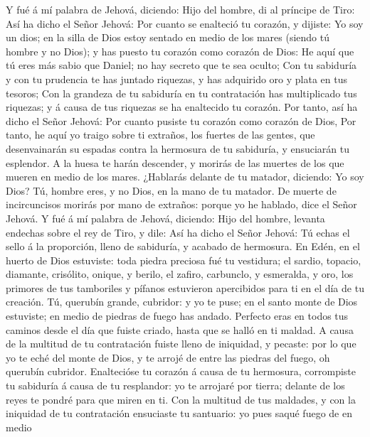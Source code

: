  Y fué á mí palabra de Jehová, diciendo:  Hijo
del hombre, di al príncipe de Tiro: Así ha dicho el Señor Jehová: Por
cuanto se enalteció tu corazón, y dijiste: Yo soy un dios; en la silla
de Dios estoy sentado en medio de los mares (siendo tú hombre y no
Dios); y has puesto tu corazón como corazón de Dios:  He
aquí que tú eres más sabio que Daniel; no hay secreto que te sea oculto;
 Con tu sabiduría y con tu prudencia te has juntado
riquezas, y has adquirido oro y plata en tus tesoros;  Con
la grandeza de tu sabiduría en tu contratación has multiplicado tus
riquezas; y á causa de tus riquezas se ha enaltecido tu corazón.
 Por tanto, así ha dicho el Señor Jehová: Por cuanto pusiste
tu corazón como corazón de Dios,  Por tanto, he aquí yo
traigo sobre ti extraños, los fuertes de las gentes, que desenvainarán
su espadas contra la hermosura de tu sabiduría, y ensuciarán tu
esplendor.  A la huesa te harán descender, y morirás de las
muertes de los que mueren en medio de los mares.  ¿Hablarás
delante de tu matador, diciendo: Yo soy Dios? Tú, hombre eres, y no
Dios, en la mano de tu matador.  De muerte de incircuncisos
morirás por mano de extraños: porque yo he hablado, dice el Señor
Jehová.  Y fué á mí palabra de Jehová, diciendo:
 Hijo del hombre, levanta endechas sobre el rey de Tiro, y
dile: Así ha dicho el Señor Jehová: Tú echas el sello á la proporción,
lleno de sabiduría, y acabado de hermosura.  En Edén, en el
huerto de Dios estuviste: toda piedra preciosa fué tu vestidura; el
sardio, topacio, diamante, crisólito, onique, y berilo, el zafiro,
carbunclo, y esmeralda, y oro, los primores de tus tamboriles y pífanos
estuvieron apercibidos para ti en el día de tu creación. 
Tú, querubín grande, cubridor: y yo te puse; en el santo monte de Dios
estuviste; en medio de piedras de fuego has andado. 
Perfecto eras en todos tus caminos desde el día que fuiste criado, hasta
que se halló en ti maldad.  A causa de la multitud de tu
contratación fuiste lleno de iniquidad, y pecaste: por lo que yo te eché
del monte de Dios, y te arrojé de entre las piedras del fuego, oh
querubín cubridor.  Enaltecióse tu corazón á causa de tu
hermosura, corrompiste tu sabiduría á causa de tu resplandor: yo te
arrojaré por tierra; delante de los reyes te pondré para que miren en
ti.  Con la multitud de tus maldades, y con la iniquidad de
tu contratación ensuciaste tu santuario: yo pues saqué fuego de en medio
